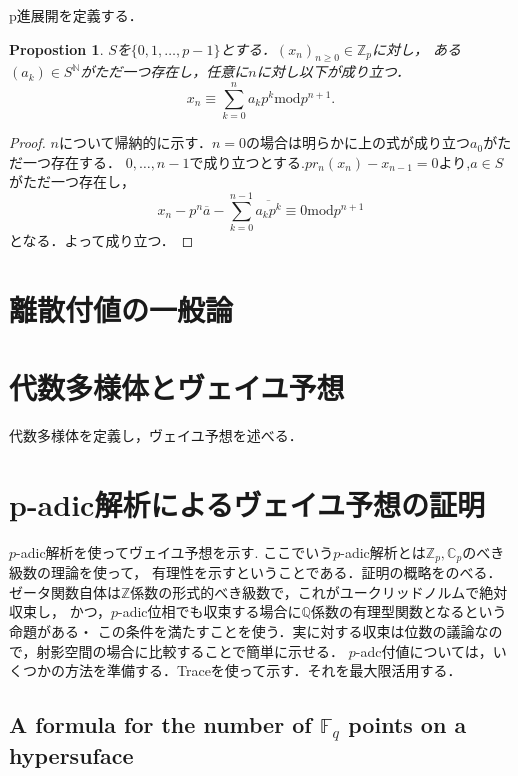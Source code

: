 \documentclass{ujarticle}
\newtheorem{prop}[thm]{Propostion}
\begin{document}
p進展開を定義する．
\begin{prop}
 $S$を$\{ 0,1, \dots,p-1\}$とする．$(x_n)_{n \ge 0} \in \mathbb{Z}_p$に対し，
 ある$(a_k) \in S^{\mathbb{N}}$がただ一つ存在し，任意に$n$に対し以下が成り立つ．
\begin{equation}
  x_n \equiv \sum_{k=0}^n a_kp^k \mathrm{mod} p^{n+1}.
\end{equation}
\end{prop}
\begin{proof}
 $n$について帰納的に示す．$n=0$の場合は明らかに上の式が成り立つ$a_0$がただ一つ存在する．
 $0,\dots,n-1$で成り立つとする.$pr_n(x_n) - x_{n-1}=0$より,$a \in S$がただ一つ存在し，
 \begin{equation*}
   x_n -p^n\overline{a} - \sum_{k=0}^{n-1} \overline{a_kp^k} \equiv 0 \mathrm{mod} p^{n+1}
 \end{equation*}
となる．よって成り立つ．
\end{proof}




\section{離散付値の一般論}
\label{sec:離散付値の一般論}


\section{代数多様体とヴェイユ予想}
\label{sec:代数多様体とヴェイユ予想}
代数多様体を定義し，ヴェイユ予想を述べる．

\section{p-adic解析によるヴェイユ予想の証明}
\label{sec:p-adicによるヴェイユ予想の証明}

$p$-adic解析を使ってヴェイユ予想を示す.
ここでいう$p$-adic解析とは$\mathbb{Z}_p,\mathbb{C}_p$のべき級数の理論を使って，
有理性を示すということである．証明の概略をのべる．
ゼータ関数自体は$\mathbb{Z}$係数の形式的べき級数で，これがユークリッドノルムで絶対収束し，
かつ，$p$-adic位相でも収束する場合に$\mathbb{Q}$係数の有理型関数となるという命題がある・
この条件を満たすことを使う．実に対する収束は位数の議論なので，射影空間の場合に比較することで簡単に示せる．
$p$-adc付値については，いくつかの方法を準備する．Traceを使って示す．それを最大限活用する．

\subsection{A formula for the number of
$\mathbb{F}_q$ points on a hypersuface}
\label{sub:A formula for the number of F_q points on a hypersuface}
\end{document}
